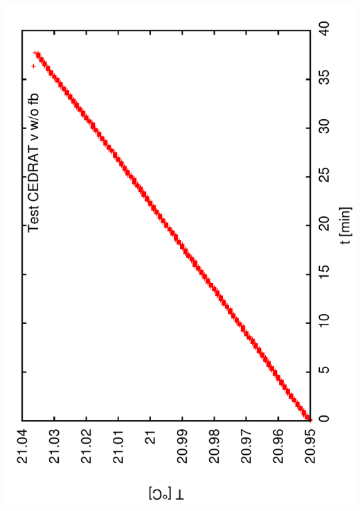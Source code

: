 \documentclass[a4paper,11pt]{book}
\begin{document}
\includegraphics[angle=-90,scale=0.15]{image31a.pdf}\\
\end{document}
